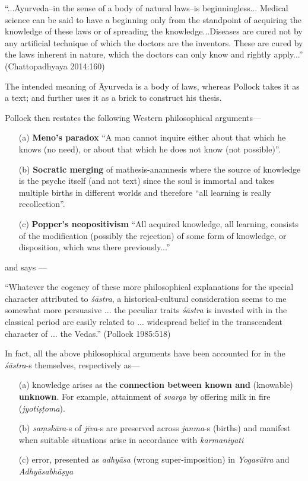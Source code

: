 \newpage

\begin{myquote}
``...Āyurveda--in the sense of a body of natural laws--is beginningless... Medical science can be said to have a beginning only from the standpoint of acquiring the knowledge of these laws or of spreading the knowledge...Diseases are cured not by any artiﬁcial technique of which the doctors are the inventors. These are cured by the laws inherent in nature, which the doctors can only know and rightly apply...'' (Chattopadhyaya 2014:160)
\end{myquote}

The intended meaning of Āyurveda is a body of laws, whereas Pollock takes it as a text; and further uses it as a brick to construct his thesis. 

Pollock then restates the following Western philosophical arguments---
\begin{itemize}
\item[(a)] {\bf Meno's paradox} ``A man cannot inquire either about that which he knows (no need), or about that which he does not know (not possible)''.

\item[(b)] {\bf Socratic merging} of mathesis-anamnesis where the source of knowledge is the psyche itself (and not text) since the soul is immortal and takes multiple births in different worlds and therefore ``all learning is really recollection''.

\item[(c)] {\bf Popper's neopositivism} ``All acquired knowledge, all learning, consists of the modiﬁcation (possibly the rejection) of some form of knowledge, or disposition, which was there previously...''
\end{itemize}
and says ---
\begin{myquote}
``Whatever the cogency of these more philosophical explanations for the special character attributed to {\sl śāstra}, a historical-cultural consideration seems to me somewhat more persuasive ... the peculiar traits {\sl śāstra} is invested with in the classical period are easily related to ... widespread belief in the transcendent character of ... the Vedas.'' (Pollock 1985:518)
\end{myquote}

In fact, all the above philosophical arguments have been accounted for in the {\sl śāstra}-s themselves, respectively as---
\begin{itemize}
\item[(a)] knowledge arises as the {\bf connection between known and} (knowable) {\bf unknown}. For example, attainment of {\sl svarga} by offering milk in ﬁre ({\sl jyotiṣṭoma}).

\item[(b)] {\sl saṃskāra}-s of {\sl jīva}-s are preserved across {\sl janma}-s (births) and manifest when suitable situations arise in accordance with {\sl karmaniyati}

\item[(c)] error, presented as {\sl adhyāsa} (wrong super-imposition) in {\sl Yogasūtra} and {\sl Adhyāsabhāṣya}
\end{itemize}

